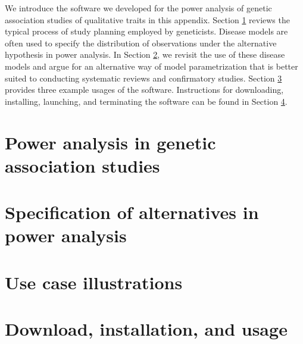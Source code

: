 
We introduce the software we developed for the power analysis of genetic association studies of qualitative traits in this appendix.
Section \ref{sec:power-analysis-overview} reviews the typical process of study planning employed by geneticists.
Disease models are often used to specify the distribution of observations under the alternative hypothesis in power analysis. 
In Section \ref{sec:disease-models}, we revisit the use of these disease models and argue for an alternative way of model parametrization that is better suited to conducting systematic reviews and confirmatory studies.
Section \ref{sec:user-guide} provides three example usages of the software.
Instructions for downloading, installing, launching, and terminating the software can be found in Section \ref{sec:UPASS-misc}.

\section{Power analysis in genetic association studies}
\label{sec:power-analysis-overview}


\section{Specification of alternatives in power analysis}
\label{sec:disease-models}


\section{Use case illustrations}
\label{sec:user-guide}


\section{Download, installation, and usage}
\label{sec:UPASS-misc}

